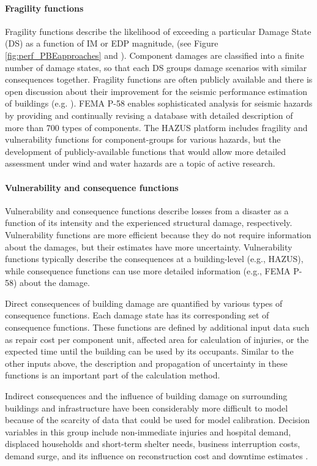 \paragraph{Fragility functions} Fragility functions describe the likelihood of exceeding a particular Damage State (DS) as a function of IM or EDP magnitude, (see Figure \ref{fig:perf_PBEapproaches} and \citep{baker2021seismic}). Component damages are classified into a finite number of damage states, so that each DS groups damage scenarios with similar consequences together. Fragility functions are often publicly available and there is open discussion about their improvement for the seismic performance estimation of buildings (e.g. \cite{silva2019current}). FEMA P-58 enables sophisticated analysis for seismic hazards by providing \citep{atc2012p-58} and continually revising \citep{atc2018p-58-1} a database with detailed description of more than 700 types of components. The HAZUS platform includes fragility and vulnerability functions for component-groups for various hazards, but the development of publicly-available functions that would allow more detailed assessment under wind and water hazards are a topic of active research.

\paragraph{Vulnerability and consequence functions} Vulnerability and consequence functions describe losses from a disaster as a function of its intensity and the experienced structural damage, respectively. Vulnerability functions are more efficient because they do not require information about the damages, but their estimates have more uncertainty. Vulnerability functions typically describe the consequences at a building-level (e.g., HAZUS), while consequence functions can use more detailed information (e.g., FEMA P-58) about the damage.

Direct consequences of building damage are quantified by various types of consequence functions. Each damage state has its corresponding set of consequence functions. These functions are defined by additional input data such as repair cost per component unit, affected area for calculation of injuries, or the expected time until the building can be used by its occupants. Similar to the other inputs above, the description and propagation of uncertainty in these functions is an important part of the calculation method.

Indirect consequences and the influence of building damage on surrounding buildings and infrastructure have been considerably more difficult to model because of the scarcity of data that could be used for model calibration. Decision variables in this group include non-immediate injuries and hospital demand, displaced households and short-term shelter needs, business interruption costs, demand surge, and its influence on reconstruction cost and downtime estimates \citep{arup2013resiliencebased}.

